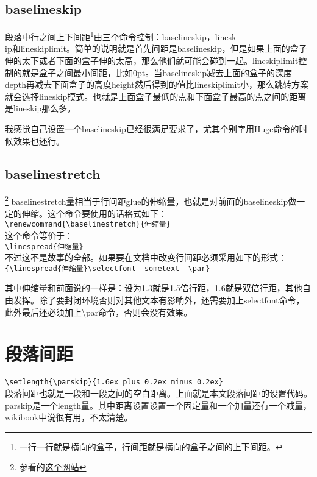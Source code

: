 \documentclass[11pt,oneside]{book}
\begin{document}
  \subsection{baselineskip}
  段落中行之间上下间距\footnote{一行一行就是横向的盒子，行间距就是横向的盒子之间的上下间距。}由三个命令控制：baselineskip，linesk-\\ip和lineskiplimit。简单的说明就是首先间距是baselineskip，但是如果上面的盒子伸的太下或者下面的盒子伸的太高，那么他们就可能会碰到一起。lineskiplimit控制的就是盒子之间最小间距，比如0pt。当baselineskip减去上面的盒子的深度depth再减去下面盒子的高度height然后得到的值比lineskiplimit小，那么跳转方案就会选择lineskip模式。也就是上面盒子最低的点和下面盒子最高的点之间的距离是lineskip那么多。

  我感觉自己设置一个baselineskip已经很满足要求了，尤其个别字用Huge命令的时候效果也还行。


  \subsection{baselinestretch}\footnote{参看的\href{http://tex.stackexchange.com/questions/49596/no-effect-of-baselinestretch}{这个网站}}
  baselinestretch量相当于行间距glue的伸缩量，也就是对前面的baselineskip做一定的伸缩。这个命令要使用的话格式如下：\\
  \verb+\renewcommand{\baselinestretch}{伸缩量}+\\
  这个命令等价于：\\
  \verb+\linespread{伸缩量}+\\
  不过这不是故事的全部。如果要在文档中改变行间距必须采用如下的形式：\\
  \verb+{\linespread{伸缩量}\selectfont  sometext  \par}+

  {\linespread{3} \selectfont 其中伸缩量和前面说的一样是：设为1.3就是1.5倍行距，1.6就是双倍行距，其他自由发挥。除了要封闭环境否则对其他文本有影响外，还需要加上selectfont命令，此外最后还必须加上\textbackslash par命令，否则会没有效果。\par}



  \section{段落间距}
  \verb+\setlength{\parskip}{1.6ex plus 0.2ex minus 0.2ex}+\\
  段落间距也就是一段和一段之间的空白距离。上面就是本文段落间距的设置代码。parskip是一个length量。其中距离设置设置一个固定量和一个加量还有一个减量，wikibook中说很有用，不太清楚。
\end{document}
